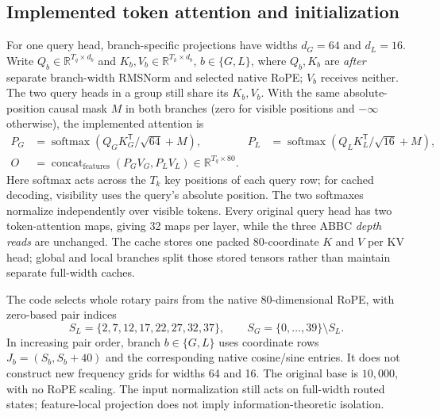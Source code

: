 \documentclass[11pt,letterpaper]{article}
\begin{document}
\subsection{Implemented token attention and initialization}
For one query head, branch-specific projections have widths $d_G=64$ and
$d_L=16$. Write $Q_b\in\mathbb R^{T_q\times d_b}$ and
$K_b,V_b\in\mathbb R^{T_k\times d_b}$, $b\in\{G,L\}$, where $Q_b,K_b$
are \emph{after} separate branch-width RMSNorm and selected native RoPE;
$V_b$ receives neither. The two query heads in a group still share its
$K_b,V_b$. With the same absolute-position causal
mask $M$ in both branches (zero for visible positions and $-\infty$ otherwise),
the implemented attention is
\begin{align}
 P_G&=\operatorname{softmax}(Q_GK_G^{\mathsf T}/\sqrt{64}+M), &
 P_L&=\operatorname{softmax}(Q_LK_L^{\mathsf T}/\sqrt{16}+M),\\
 O&=\operatorname{concat}_{\mathrm{features}}(P_GV_G,P_LV_L)
       \in\mathbb R^{T_q\times80}.
 \label{eq:compound-attention}
\end{align}
Here softmax acts across the $T_k$ key positions of each query row; for
cached decoding, visibility uses the query's absolute position. The two
softmaxes normalize independently over visible tokens. Every original
query head has two token-attention maps, giving 32 maps per layer, while
the three ABBC \emph{depth reads} are unchanged. The cache stores one packed
80-coordinate $K$ and $V$ per KV head; global and local branches split those
stored tensors rather than maintain separate full-width caches.

The code selects whole rotary pairs from the native 80-dimensional RoPE,
with zero-based pair indices
\begin{equation}
 S_L=\{2,7,12,17,22,27,32,37\},\qquad
 S_G=\{0,\ldots,39\}\setminus S_L.
 \label{eq:compound-rope}
\end{equation}
In increasing pair order, branch $b\in\{G,L\}$ uses coordinate rows
$J_b=(S_b,S_b+40)$ and the corresponding native cosine/sine entries.
It does not construct new frequency grids for widths 64 and 16.
The original base is $10,000$, with no RoPE scaling. The input normalization
still acts on full-width routed states; feature-local projection does not
imply information-theoretic isolation.
\end{document}

